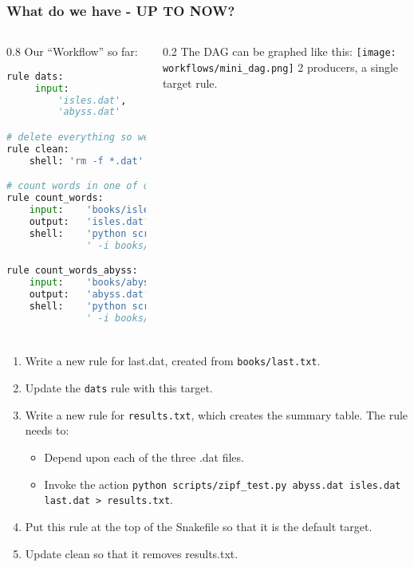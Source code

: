 \begin{frame}[fragile]
  \frametitle{What do we have - UP TO NOW?}
  \begin{columns}
   \begin{column}{0.8\textwidth}
     Our ``Workflow'' so far:
     \begin{lstlisting}[language=Python,style=Python, basicstyle=\tiny]
rule dats:
     input:
         'isles.dat',
         'abyss.dat'

# delete everything so we can re-run things
rule clean:
    shell: 'rm -f *.dat'

# count words in one of our "books"
rule count_words:
    input:    'books/isles.txt'
    output:   'isles.dat'
    shell:    'python scripts/wordcount.py'
              ' -i books/isles.txt -o isles.dat'

rule count_words_abyss:
    input:    'books/abyss.txt'
    output:   'abyss.dat'
    shell:    'python scripts/wordcount.py' 
              ' -i books/abyss.txt -o abyss.dat'     
     \end{lstlisting}

   \end{column}
   
   \begin{column}{0.2\textwidth}
     The DAG can be graphed like this:
     \texttt{[image: workflows/mini\_dag.png]}
     2 producers, a single target rule.
   \end{column}
  \end{columns}
\end{frame}

\begin{frame}[fragile]
  \frametitle{}
  \begin{enumerate}
   \item Write a new rule for last.dat, created from \texttt{books/last.txt}.
   \item Update the \texttt{dats} rule with this target.
   \item Write a new rule for \texttt{results.txt}, which creates the summary table. The rule needs to:
        \begin{itemize}
         \item Depend upon each of the three .dat files.
         \item Invoke the action \texttt{python scripts/zipf\_test.py abyss.dat isles.dat last.dat > results.txt}.
        \end{itemize}
   \item Put this rule at the top of the Snakefile so that it is the default target.
   \item Update clean so that it removes results.txt.
  \end{enumerate}
\end{frame}


  

